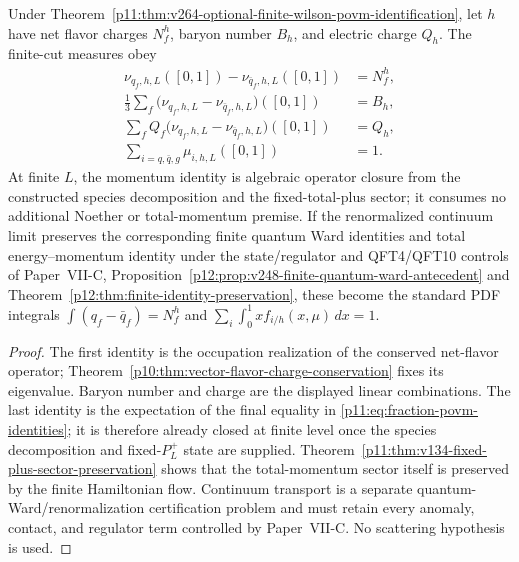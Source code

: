 \documentclass[12pt,a4paper]{article}
\begin{document}
\begin{theorem}
\label{p11:thm:v264-optional-finite-pdf-sum-rules}
Under Theorem~\ref{p11:thm:v264-optional-finite-wilson-povm-identification}, let \(h\) have net
flavor charges \(N_f^h\), baryon number \(B_h\), and electric charge \(Q_h\).
The finite-cut measures obey
\begin{align}
\label{p11:eq:pdf-net-flavor-sum-rule}
\nu_{q_f,h,L}([0,1])-\nu_{\bar q_f,h,L}([0,1])&=N_f^h,\\
\label{p11:eq:pdf-baryon-sum-rule}
\frac13\sum_f\bigl(\nu_{q_f,h,L}-\nu_{\bar q_f,h,L}\bigr)([0,1])&=B_h,\\
\label{p11:eq:pdf-charge-sum-rule}
\sum_f Q_f\bigl(\nu_{q_f,h,L}-\nu_{\bar q_f,h,L}\bigr)([0,1])&=Q_h,\\
\label{p11:eq:pdf-momentum-sum-rule}
\sum_{i=q,\bar q,g}\mu_{i,h,L}([0,1])&=1.
\end{align}
At finite $L$, the momentum identity is algebraic operator closure from the
constructed species decomposition and the fixed-total-plus sector; it consumes
no additional Noether or total-momentum premise.  If the renormalized continuum
limit preserves the corresponding finite quantum Ward identities and total
energy--momentum identity under the state/regulator and QFT4/QFT10 controls of
Paper~VII-C, Proposition~\ref{p12:prop:v248-finite-quantum-ward-antecedent} and
Theorem~\ref{p12:thm:finite-identity-preservation}, these become the standard
PDF integrals \(\int(q_f-\bar q_f)=N_f^h\) and
\(\sum_i\int_0^1x f_{i/h}(x,\mu)\,dx=1\).
\end{theorem}
\begin{proof}
The first identity is the occupation realization of the conserved net-flavor
operator; Theorem~\ref{p10:thm:vector-flavor-charge-conservation} fixes its
eigenvalue.  Baryon number and charge are the displayed linear combinations.
The last identity is the expectation of the final equality in
\eqref{p11:eq:fraction-povm-identities}; it is therefore already closed at
finite level once the species decomposition and fixed-$P_L^+$ state are
supplied.  Theorem~\ref{p11:thm:v134-fixed-plus-sector-preservation} shows
that the total-momentum sector itself is preserved by the finite Hamiltonian
flow.  Continuum transport is a separate quantum-Ward/renormalization
certification problem and must retain every anomaly, contact, and regulator
term controlled by Paper~VII-C.  No scattering hypothesis is used.
\end{proof}
\end{document}
